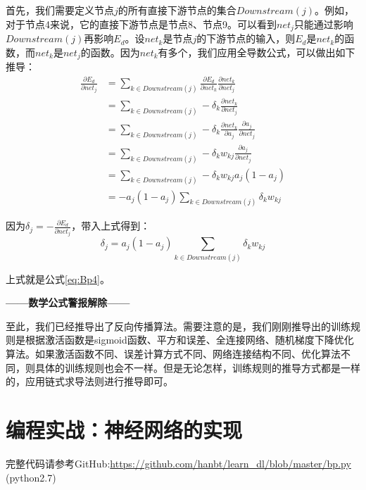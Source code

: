 首先，我们需要定义节点\(j\)的所有直接下游节点的集合\(Downstream(j)\)。例如，对于节点4来说，它的直接下游节点是节点8、节点9。可以看到\(net_j\)只能通过影响\(Downstream(j)\)再影响\(E_d\)。设\(net_k\)是节点\(j\)的下游节点的输入，则\(E_d\)是\(net_k\)的函数，而\(net_k\)是\(net_j\)的函数。因为\(net_k\)有多个，我们应用全导数公式，可以做出如下推导：
\begin{align*}
	\frac{\partial{E_d}}{\partial{net_j}} & =\sum_{k\in Downstream(j)}\frac{\partial{E_d}}{\partial{net_k}}\frac{\partial{net_k}}{\partial{net_j}}        \\
	                                      & =\sum_{k\in Downstream(j)}-\delta_k\frac{\partial{net_k}}{\partial{net_j}}                                    \\
	                                      & =\sum_{k\in Downstream(j)}-\delta_k\frac{\partial{net_k}}{\partial{a_j}}\frac{\partial{a_j}}{\partial{net_j}} \\
	                                      & =\sum_{k\in Downstream(j)}-\delta_kw_{kj}\frac{\partial{a_j}}{\partial{net_j}}                                \\
	                                      & =\sum_{k\in Downstream(j)}-\delta_kw_{kj}a_j(1-a_j)                                                           \\
	                                      & =-a_j(1-a_j)\sum_{k\in Downstream(j)}\delta_kw_{kj}
\end{align*}

因为\(\delta_j=-\frac{\partial{E_d}}{\partial{net_j}}\)，带入上式得到：
\[
	\delta_j=a_j(1-a_j)\sum_{k\in Downstream(j)}\delta_kw_{kj}
\]

上式就是公式\ref{eq:Bp4}。

\textbf{——数学公式警报解除——}

至此，我们已经推导出了反向传播算法。需要注意的是，我们刚刚推导出的训练规则是根据激活函数是sigmoid函数、平方和误差、全连接网络、随机梯度下降优化算法。如果激活函数不同、误差计算方式不同、网络连接结构不同、优化算法不同，则具体的训练规则也会不一样。但是无论怎样，训练规则的推导方式都是一样的，应用链式求导法则进行推导即可。


\section{编程实战：神经网络的实现}\label{Bp:8}
\begin{note}
	完整代码请参考GitHub:\url{https://github.com/hanbt/learn_dl/blob/master/bp.py} (python2.7)
\end{note}

